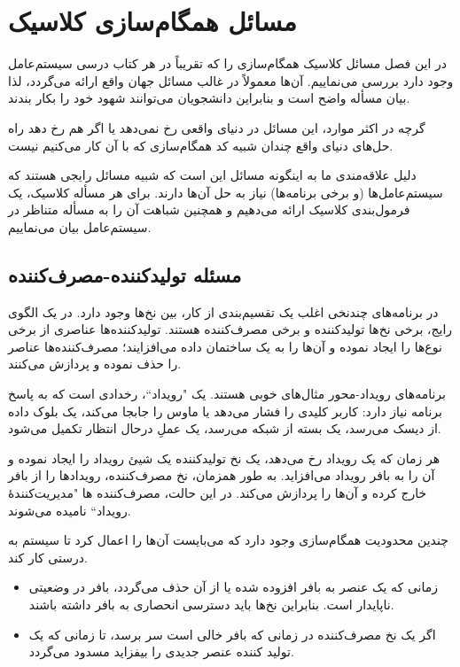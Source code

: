 \documentclass{book}
\newcommand{\clearemptydoublepage}{\newpage\cleardoublepage}
\begin{document}
\clearemptydoublepage
\chapter{مسائل همگام‌سازی کلاسیک}

    در این فصل مسائل کلاسیک همگام‌سازی را که تقریباً در هر کتاب درسی سیستم‌عامل وجود دارد بررسی می‌نماییم. 
    آن‌ها معمولاً در غالب مسائل جهان واقع ارائه می‌گردد، لذا بیان مسأله واضح است و بنابراین دانشجویان می‌توانند شهود خود را بکار بندند. 
    
    گرچه در اکثر موارد، این مسائل در دنیای واقعی رخ نمی‌دهد یا اگر هم رخ دهد راه حل‌های دنیای واقع چندان شبیه کد همگام‌سازی 
    که با آن کار می‌کنیم نیست. 

    دلیل علاقه‌مندی ما به اینگونه مسائل این است که شبیه مسائل رایجی هستند که سیستم‌عامل‌ها  (و برخی برنامه‌ها) نیاز به حل آن‌ها دارند. 
    برای هر مسأله کلاسیک، یک فرمول‌بندی کلاسیک ارائه می‌دهیم و همچنین شباهت آن را به مسأله متناظر در سیستم‌عامل  بیان می‌نماییم. 

\section{مسئله تولیدکننده-مصرف‌کننده}

    در برنامه‌های چندنخی اغلب یک تقسیم‌بندی از کار، بین نخ‌ها وجود دارد. در یک الگوی رایج، برخی نخ‌ها تولیدکننده و برخی مصرف‌کننده هستند. 
    تولیدکننده‌ها عناصری از برخی نوع‌ها را ایجاد نموده و آن‌ها را به یک ساختمان داده می‌افزایند؛ مصرف‌کننده‌ها عناصر را حذف نموده و پردازش می‌کنند.

    برنامه‌های رویداد-محور مثال‌های خوبی هستند. یک "رویداد``، رخدادی است که به پاسخ برنامه نیاز دارد: 
    کاربر کلیدی را فشار می‌دهد یا ماوس را جابجا می‌کند، یک بلوک داده از دیسک می‌رسد، یک بسته از شبکه می‌رسد، یک عملِ در‌حال انتظار تکمیل می‌شود.

    هر زمان که یک رویداد رخ می‌دهد، یک نخ تولید‌کننده یک شیئ رویداد را ایجاد نموده و آن را به بافر رویداد می‌افزاید. 
    به طور همزمان، نخ مصرف‌کننده، رویدادها را از بافر خارج کرده و آن‌ها را پردازش می‌کند. 
    در این حالت، مصرف‌کننده ها "مدیریت‌کنندهٔ رویداد`` نامیده می‌شوند.

    چندین محدودیت همگام‌سازی وجود دارد که می‌بایست آن‌ها را اعمال کرد تا سیستم به درستی کار کند. 

\begin{itemize}

\item 
    زمانی که یک عنصر به بافر افزوده شده یا از آن حذف می‌گردد، بافر در وضعیتی ناپایدار است.
    بنابراین نخ‌ها باید دسترسی انحصاری به بافر داشته باشند.
    
\item 
    اگر یک نخ مصرف‌کننده در زمانی که بافر خالی است سر برسد، تا زمانی که یک تولید کننده عنصر جدیدی را بیفزاید مسدود می‌گردد.

\end{itemize}
\end{document}

